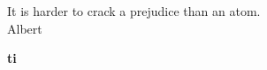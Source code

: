 \documentclass[a4paper,12pt,bibliography=totoc,index=totoc,twoside,francais]{scrbook}
\let\Oldgls\gls%
\renewcommand{\gls}[1]{%
\textbf{ \Oldgls{#1}} 
}
\begin{document}


\frontmatter
\begin{flushright}
It is harder to crack a prejudice than an atom.\\
Albert \\
\end{flushright}

\tableofcontents
\listoftables
\listoffigures

\mainmatter










\appendix

%
\gls{ti}

\backmatter
\nocite{*}
\printbibliography
\printindex

\glsaddall
\printglossaries

\cleardoublepage

\end{document}
